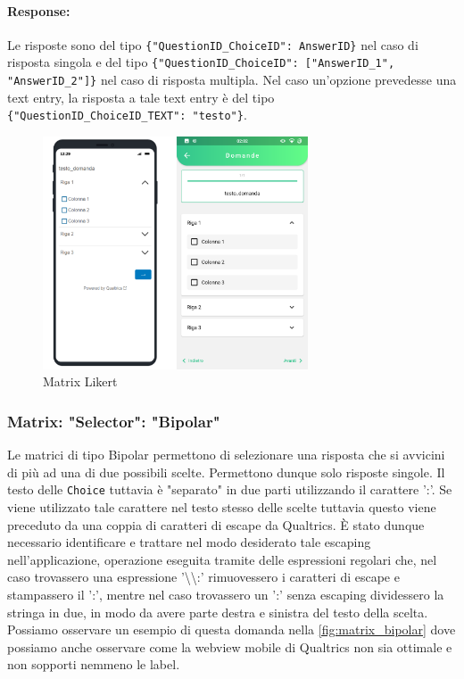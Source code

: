 \paragraph{Response:}
Le risposte sono del tipo \texttt{\{"QuestionID\_ChoiceID": AnswerID\}} nel caso di risposta singola e del tipo \texttt{\{"QuestionID\_ChoiceID": ["AnswerID\_1", "AnswerID\_2"]\}} nel caso di risposta multipla. Nel caso un'opzione prevedesse una text entry, la risposta a tale text entry è del tipo \texttt{\{"QuestionID\_ChoiceID\_TEXT": "testo"\}}.

\begin{figure}[h!]
\centering
\includegraphics[width=0.7\textwidth]{img/matrix_likert}
\caption{Matrix Likert}
\label{fig:matrix_likert}
\end{figure}

\subsubsection{Matrix: "Selector": "Bipolar"}
Le matrici di tipo Bipolar permettono di selezionare una risposta che si avvicini di più ad una di due possibili scelte. Permettono dunque solo risposte singole. Il testo delle \texttt{Choice} tuttavia è "separato" in due parti utilizzando il carattere ':'. Se viene utilizzato tale carattere nel testo stesso delle scelte tuttavia questo viene preceduto da una coppia di caratteri di escape da Qualtrics. È stato dunque necessario identificare e trattare nel modo desiderato tale escaping nell'applicazione, operazione eseguita tramite delle espressioni regolari che, nel caso trovassero una espressione '\textbackslash\textbackslash:' rimuovessero i caratteri di escape e stampassero il ':', mentre nel caso trovassero un ':' senza escaping dividessero la stringa in due, in modo da avere parte destra e sinistra del testo della scelta. Possiamo osservare un esempio di questa domanda nella \autoref{fig:matrix_bipolar} dove possiamo anche osservare come la webview mobile di Qualtrics non sia ottimale e non sopporti nemmeno le label.

